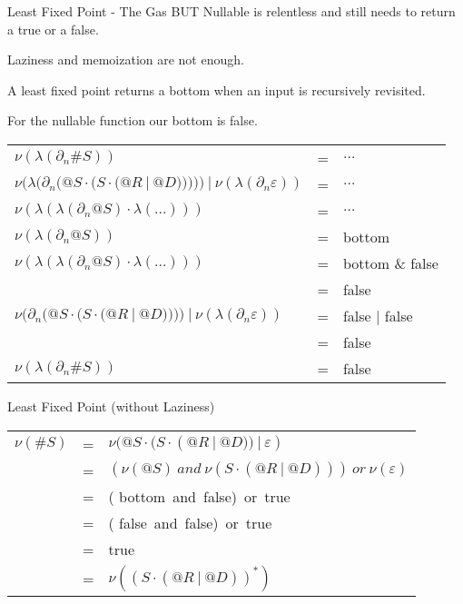 \documentclass[10pt]{beamer}
\begin{document}
\begin{frame}{Least Fixed Point - The Gas}
BUT Nullable is relentless and still needs to return a true or a false.

Laziness and memoization are not enough.

A least fixed point returns a bottom when an input is recursively revisited.

For the nullable function our bottom is false.

\begin{center}
\begin{tabular}{lll}
$\nu(\lambda(\partial_n \#S))$ &=& $\ldots$\\
$\nu(\lambda(\partial_n(@S \cdot (S \cdot ( @R\ |\ @D )))))\ |\ \nu(\lambda(\partial_n \varepsilon))$ &=& $\ldots$ \\
$\nu(\lambda(\lambda(\partial_n @S) \cdot \lambda(\ldots)))$& = & $\ldots$ \\
$\nu(\lambda(\partial_n @S))$ &=& {\color{mLightGreen} bottom} \\
$\nu(\lambda(\lambda(\partial_n @S) \cdot \lambda(\ldots)))$& = & {\color{mLightGreen} bottom} \& false \\
&=& {\color{mLightGreen} false} \\
$\nu(\partial_n(@S \cdot (S \cdot ( @R\ |\ @D ))))\ |\ \nu(\lambda(\partial_n \varepsilon))$ &=& {\color{mLightGreen} false} | false\\
&=& {\color{mLightGreen} false} \\
$\nu(\lambda(\partial_n \#S))$ &=& {\color{mLightGreen} false} \\
\end{tabular}
\end{center}
\end{frame}

\begin{frame}{Least Fixed Point (without Laziness)}
\begin{center}
\begin{tabular}{lll}
$\nu(\#S)$ & = & $\nu(@S \cdot (S \cdot ( @R\ |\ @D ))\ |\ \varepsilon)$ \\
& = & $(\nu(@S)\ and\ \nu(S \cdot ( @R\ |\ @D )))\ or\  \nu(\varepsilon)$ \\
& = & ({\color{mLightGreen} bottom}\ and\ false)\ or\ true \\
& = & ({\color{mLightGreen} false}\ and\ false)\ or\ true \\
& = & {\color{mLightGreen} true} \\
& = & $\nu((S \cdot ( @R\ |\ @D ))^{*})$ \\
\end{tabular}
\end{center}
\end{frame}
\end{document}
